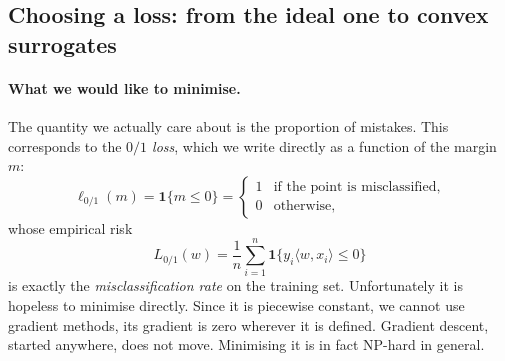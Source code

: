 \subsection{Choosing a loss: from the ideal one to convex surrogates}
\label{subsec:class-losses}

\paragraph{What we would like to minimise.}
The quantity we actually care about is the proportion of mistakes. This corresponds
to the \emph{$0/1$ loss}, which we write directly as a function of the margin $m$:
\[
\ell_{0/1}(m) = \mathbf{1}\{ m \leq 0 \}
= \begin{cases} 1 & \text{if the point is misclassified,} \\ 0 & \text{otherwise,}\end{cases}
\]
whose empirical risk
\[
L_{0/1}(w) = \frac{1}{n} \sum_{i=1}^n \mathbf{1}\big\{ y_i \langle w, x_i \rangle \leq 0 \big\}
\]
is exactly the \emph{misclassification rate} on the training set. Unfortunately it is hopeless to
minimise directly. Since it is piecewise constant, we cannot use gradient methods, its gradient is zero wherever it is defined. Gradient descent, started anywhere, does not move.
Minimising it is in fact NP-hard in general.

